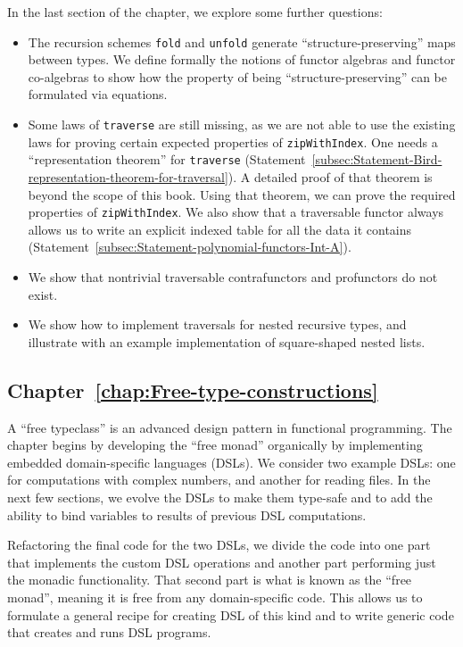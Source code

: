 In the last section of the chapter, we explore some further questions:
\begin{itemize}
\item The recursion schemes \lstinline!fold! and \lstinline!unfold! generate
\textsf{``}structure-preserving\textsf{''} maps between types. We define formally
the notions of functor algebras and functor co-algebras to show how
the property of being \textsf{``}structure-preserving\textsf{''} can be formulated
via equations.
\item Some laws of \lstinline!traverse! are still missing, as we are not
able to use the existing laws for proving certain expected properties
of \lstinline!zipWithIndex!. One needs a \textsf{``}representation theorem\textsf{''}
for \lstinline!traverse! (Statement~\ref{subsec:Statement-Bird-representation-theorem-for-traversal}).
A detailed proof of that theorem is beyond the scope of this book.
Using that theorem, we can prove the required properties of \lstinline!zipWithIndex!.
We also show that a traversable functor always allows us to write
an explicit indexed table for all the data it contains (Statement~\ref{subsec:Statement-polynomial-functors-Int-A}).
\item We show that nontrivial traversable contrafunctors and profunctors
do not exist.
\item We show how to implement traversals for nested recursive types, and
illustrate with an example implementation of square-shaped nested
lists.
\end{itemize}

\subsection{Chapter~\ref{chap:Free-type-constructions}}

A \textsf{``}free typeclass\textsf{''} is an advanced design pattern in functional
programming. The chapter begins by developing the \textsf{``}free monad\textsf{''}
organically by implementing embedded domain-specific languages (DSLs).
We consider two example DSLs: one for computations with complex numbers,
and another for reading files. In the next few sections, we evolve
the DSLs to make them type-safe and to add the ability to bind variables
to results of previous DSL computations.

Refactoring the final code for the two DSLs, we divide the code into
one part that implements the custom DSL operations and another part
performing just the monadic functionality. That second part is what
is known as the \textsf{``}free monad\textsf{''}, meaning it is free from any domain-specific
code. This allows us to formulate a general recipe for creating DSL
of this kind and to write generic code that creates and runs DSL programs.

